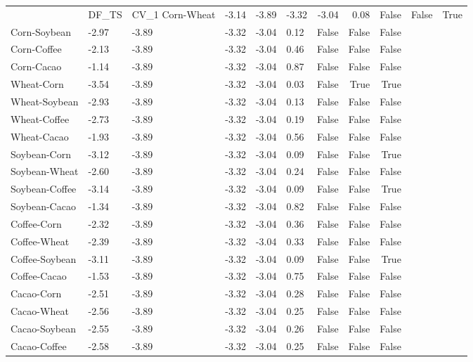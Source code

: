 \begin{tabular}{llllllrrr}
\toprule
 & DF_TS & CV_1%
\midrule
Corn-Wheat & -3.14 & -3.89 & -3.32 & -3.04 & 0.08 & False & False & True \\
Corn-Soybean & -2.97 & -3.89 & -3.32 & -3.04 & 0.12 & False & False & False \\
Corn-Coffee & -2.13 & -3.89 & -3.32 & -3.04 & 0.46 & False & False & False \\
Corn-Cacao & -1.14 & -3.89 & -3.32 & -3.04 & 0.87 & False & False & False \\
Wheat-Corn & -3.54 & -3.89 & -3.32 & -3.04 & 0.03 & False & True & True \\
Wheat-Soybean & -2.93 & -3.89 & -3.32 & -3.04 & 0.13 & False & False & False \\
Wheat-Coffee & -2.73 & -3.89 & -3.32 & -3.04 & 0.19 & False & False & False \\
Wheat-Cacao & -1.93 & -3.89 & -3.32 & -3.04 & 0.56 & False & False & False \\
Soybean-Corn & -3.12 & -3.89 & -3.32 & -3.04 & 0.09 & False & False & True \\
Soybean-Wheat & -2.60 & -3.89 & -3.32 & -3.04 & 0.24 & False & False & False \\
Soybean-Coffee & -3.14 & -3.89 & -3.32 & -3.04 & 0.09 & False & False & True \\
Soybean-Cacao & -1.34 & -3.89 & -3.32 & -3.04 & 0.82 & False & False & False \\
Coffee-Corn & -2.32 & -3.89 & -3.32 & -3.04 & 0.36 & False & False & False \\
Coffee-Wheat & -2.39 & -3.89 & -3.32 & -3.04 & 0.33 & False & False & False \\
Coffee-Soybean & -3.11 & -3.89 & -3.32 & -3.04 & 0.09 & False & False & True \\
Coffee-Cacao & -1.53 & -3.89 & -3.32 & -3.04 & 0.75 & False & False & False \\
Cacao-Corn & -2.51 & -3.89 & -3.32 & -3.04 & 0.28 & False & False & False \\
Cacao-Wheat & -2.56 & -3.89 & -3.32 & -3.04 & 0.25 & False & False & False \\
Cacao-Soybean & -2.55 & -3.89 & -3.32 & -3.04 & 0.26 & False & False & False \\
Cacao-Coffee & -2.58 & -3.89 & -3.32 & -3.04 & 0.25 & False & False & False \\
\bottomrule
\end{tabular}
